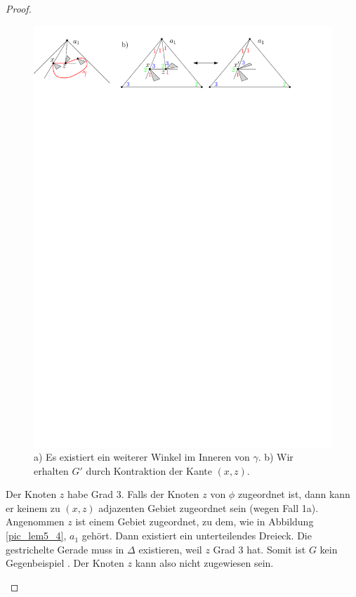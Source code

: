\begin{proof}
\begin{description}[leftmargin =0pt, font = \rmfamily ,listparindent=\parindent,parsep=0pt]
\begin{figure}[t!]
\centering
\includegraphics[width=1\textwidth]{lem5_3.pdf}
\caption{a) Es existiert ein weiterer Winkel im Inneren von $\gamma$. b) Wir erhalten $G'$ durch Kontraktion der Kante $(x,z)$.}
\label{pic_lem5_3}
\end{figure}

\item[Fall 1b:] Der Knoten $z$ habe Grad 3. Falls der Knoten $z$ von $\phi$ zugeordnet ist, dann kann er keinem zu $(x,z)$ adjazenten Gebiet zugeordnet sein (wegen Fall 1a). Angenommen $z$ ist einem Gebiet zugeordnet, zu dem, wie in Abbildung \ref{pic_lem5_4}, $a_1$ gehört. Dann existiert ein unterteilendes Dreieck. Die gestrichelte Gerade muss in $\Delta$ existieren, weil $z$ Grad 3 hat. Somit ist $G$ kein Gegenbeispiel . Der Knoten $z$ kann also nicht zugewiesen sein.


\end{description}
\end{proof}
